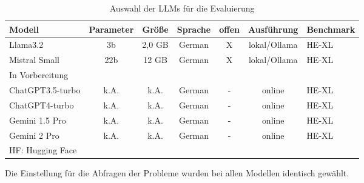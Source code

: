 \begin{table}[!ht]
	\begin{tabular}{|l|c|c|c|c|c|l|}
		\hline
		\textbf{Modell} & \textbf{Parameter} & \textbf{Größe} & \textbf{Sprache} & \textbf{offen} & \textbf{Ausführung}  & \textbf{Benchmark} \\
		\hline
		Llama3.2          &   3b & 2,0 GB & German & X & lokal/Ollama  & HE-XL \\
		Mistral Small     &  22b &  12 GB & German & X & lokal/Ollama & HE-XL \\
		\hline
		\multicolumn{7}{|l|}{In Vorbereitung} \\
		\hline
		ChatGPT3.5-turbo  & k.A. &   k.A. & German & - & online & HE-XL \\
		ChatGPT4-turbo    & k.A. &   k.A. & German & - & online & HE-XL \\
		Gemini 1.5 Pro    & k.A. &   k.A. & German & - & online & HE-XL \\
		Gemini 2 Pro      & k.A. &   k.A. & German & - & online & HE-XL \\
		\hline
		\multicolumn{7}{|l|}{HF: Hugging Face} \\
		\hline
	\end{tabular}
	\caption{Auswahl der LLMs für die Evaluierung}
	\label{tab:selected_llms}
\end{table}

Die Einstellung für die Abfragen der Probleme wurden bei allen Modellen identisch gewählt.\vspace{0.2cm}

